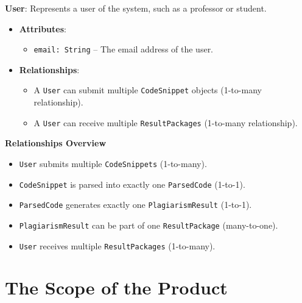 \documentclass[12pt]{article}
\begin{document}
\textbf{User}: Represents a user of the system, such as a professor or student.
\begin{itemize}
    \item \textbf{Attributes}:
    \begin{itemize}
        \item \texttt{email: String} -- The email address of the user.
    \end{itemize}
    \item \textbf{Relationships}:
    \begin{itemize}
        \item A \texttt{User} can submit multiple \texttt{CodeSnippet} objects (1-to-many relationship).
        \item A \texttt{User} can receive multiple \texttt{ResultPackages} (1-to-many relationship).
    \end{itemize}
\end{itemize}

\textbf{Relationships Overview}
\begin{itemize}
    \item \texttt{User} submits multiple \texttt{CodeSnippets} (1-to-many).
    \item \texttt{CodeSnippet} is parsed into exactly one \texttt{ParsedCode} (1-to-1).
    \item \texttt{ParsedCode} generates exactly one \texttt{PlagiarismResult} (1-to-1).
    \item \texttt{PlagiarismResult} can be part of one \texttt{ResultPackage} (many-to-one).
    \item \texttt{User} receives multiple \texttt{ResultPackages} (1-to-many).
\end{itemize}



\section{The Scope of the Product}
\end{document}
